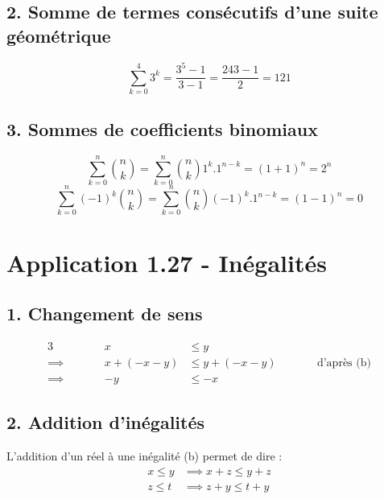 \documentclass{report}
\begin{document}
\subsection*{2. Somme de termes consécutifs d'une suite géométrique}
\begin{displaymath}
\sum_{k = 0}^{4} 3^k = \frac{3^5-1}{3-1}=\frac{243-1}{2}=121
\end{displaymath}


\subsection*{3. Sommes de coefficients binomiaux} 
\begin{displaymath}
	\sum_{k = 0}^{n} \binom{n}{k} = \sum_{k = 0}^{n} \binom{n}{k} 1^k . 1^{n-k} = (1+1)^n = 2^n
\end{displaymath}
\begin{displaymath}
	\sum_{k = 0}^{n} (-1)^k \binom{n}{k} = \sum_{k = 0}^{n} \binom{n}{k} (-1)^k . 1^{n-k} = (1-1)^n = 0
\end{displaymath}


\section*{Application 1.27 - Inégalités}

\subsection*{1. Changement de sens}
\begin{alignat*}{3}
	        &         &          x &\leq y \\
	\implies& \qquad  &   x+(-x-y) &\leq y+(-x-y) &\qquad& \text{d'après (b)}\\
	\implies&         &         -y &\leq -x
\end{alignat*}


\subsection*{2. Addition d'inégalités}

L'addition d'un réel à une inégalité (b) permet de dire :
\begin{displaymath}
	\begin{split}
x \leq y & \implies x  + z\leq y + z \\
z \leq t & \implies z + y \leq t + y
	\end{split}
\end{displaymath}
\end{document}
